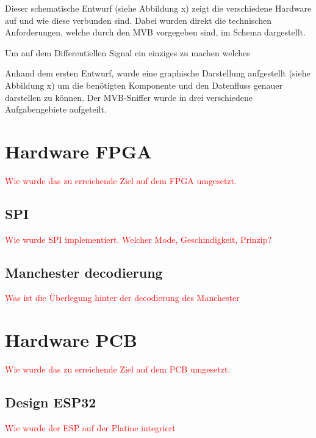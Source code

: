 Dieser schematische Entwurf (siehe Abbildung x) zeigt die verschiedene Hardware auf und wie diese verbunden sind. Dabei wurden direkt die technischen Anforderungen, welche durch den MVB vorgegeben sind, im Schema dargestellt.

Um auf dem Differentiellen Signal ein einziges zu machen welches

Anhand dem ersten Entwurf, wurde eine graphische Darstellung aufgestellt (siehe Abbildung x) um die benötigten Komponente und den Datenfluss genauer darstellen zu können. Der MVB-Sniffer wurde in drei verschiedene Aufgabengebiete aufgeteilt. 
 



\section{Hardware FPGA}
\textcolor{red}{Wie wurde das zu erreichende Ziel auf dem FPGA umgesetzt.}



\subsection{SPI}
\textcolor{red}{Wie wurde SPI implementiert. Welcher Mode, Geschindigkeit, Prinzip?}

\subsection{Manchester decodierung}
\textcolor{red}{Was ist die Überlegung hinter der decodierung des Manchester}



\section{Hardware PCB}
\textcolor{red}{Wie wurde das zu erreichende Ziel auf dem PCB umgesetzt.}

\subsection{Design ESP32}
\textcolor{red}{Wie wurde der ESP auf der Platine integriert}

